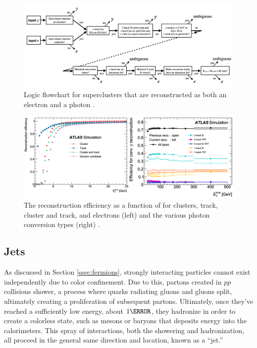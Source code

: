 \begin{figure}[h]
    \centering
    \includegraphics[width=1\textwidth]{chapters/chapter3_eventreco/images/egamma-amb.png}

    \caption[Logic flowchart for superclusters that are reconstructed as both an electron and a photon]{Logic flowchart for superclusters that are reconstructed as both an electron and a photon \cite{photon-electron-perf}.}
    \label{fig:ambiguity-logic}
\end{figure}



\begin{figure}[h]
    \centering
    \includegraphics[width=1\textwidth]{chapters/chapter3_eventreco/images/combined-efficiency.png}

    \caption[The reconstruction efficiency as a function of \et for electrons and converted photons]{The reconstruction efficiency as a function of \et for clusters, track, cluster and track, and electrons (left) and the various photon conversion types (right) \cite{photon-electron-perf}.}
    \label{fig:reco-eff}
\end{figure}


\subsection{Jets} \label{ssec:jet-reco}
As discussed in Section \ref{ssec:fermions}, strongly interacting particles cannot exist independently due to color confinement. Due to this, partons created in $pp$ collisions shower, a process where quarks radiating gluons and gluons split, ultimately creating a proliferation of subsequent partons. Ultimately, once they've reached a sufficiently low energy, about $\unit{1}{\GeV}$, they hadronize in order to create a colorless state, such as mesons or baryons that deposits energy into the calorimeters. This spray of interactions, both the showering and hadronization, all proceed in the general same direction and location, known as a ``jet.''

